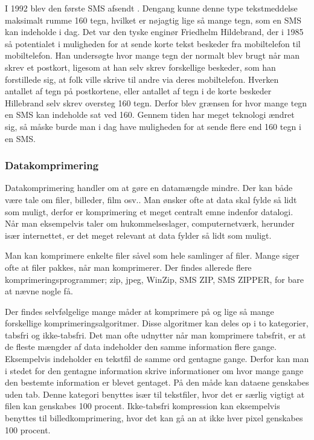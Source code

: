 I 1992 blev den første SMS afsendt \cite{museum}. Dengang kunne denne type tekstmeddelse maksimalt rumme 160 tegn, hvilket er nøjagtig lige så mange tegn, som en SMS kan indeholde i dag. Det var den tyske enginør Friedhelm Hildebrand, der i 1985 så potentialet i muligheden for at sende korte tekst beskeder fra mobiltelefon til mobiltelefon. Han undersøgte hvor mange tegn der normalt blev brugt når man skrev et postkort, ligesom at han selv skrev forskellige beskeder, som han forstillede sig, at folk ville skrive til andre via deres mobiltelefon. Hverken antallet af tegn på postkortene, eller antallet af tegn i de korte beskeder Hillebrand selv skrev oversteg 160 tegn. Derfor blev grænsen for hvor mange tegn en SMS kan indeholde sat ved 160.
Gennem tiden har meget teknologi ændret sig, så måske burde man i dag have muligheden for at sende flere end 160 tegn i en SMS. \cite{hillebrand}

\subsubsection {Datakomprimering}

Datakomprimering handler om at gøre en datamængde mindre. Der kan både være tale om filer, billeder, film osv.. Man ønsker ofte at data skal fylde så lidt som muligt, derfor er komprimering et meget centralt emne indenfor datalogi. Når man eksempelvis taler om hukommelseslager, computernetværk, herunder især internettet, er det meget relevant at data fylder så lidt som muligt.
 
Man kan komprimere enkelte filer såvel som hele samlinger af filer. Mange siger ofte at filer pakkes, når man komprimerer. Der findes allerede flere komprimeringsprogrammer; zip, jpeg, WinZip, SMS ZIP, SMS ZIPPER, for bare at nævne nogle få.

Der findes selvfølgelige mange måder at komprimere på og lige så mange forskellige komprimeringsalgoritmer. Disse algoritmer kan deles op i to kategorier, tabsfri og ikke-tabsfri.  
Det man ofte udnytter når man komprimere tabsfrit, er at de fleste mængder af data indeholder den samme information flere gange. Eksempelvis indeholder en tekstfil de samme ord gentagne gange. Derfor kan man i stedet for den gentagne information skrive informationer om hvor mange gange den bestemte information er blevet gentaget. På den måde kan dataene genskabes uden tab. Denne kategori benyttes især til tekstfiler, hvor det er særlig vigtigt at filen kan genskabes 100 procent. Ikke-tabsfri kompression kan eksempelvis benyttes til billedkomprimering, hvor det kan gå an at ikke hver pixel genskabes 100 procent.